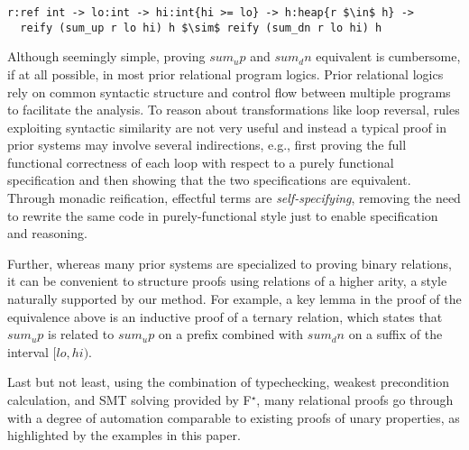 \documentclass[sigplan,screen]{acmart}\settopmatter{}
\newcommand\fstar{F$^\star$\xspace}
\newcommand{\comm}[3]{\ifcheckpagebudget\else\ifdraft{\maybecolor{#1}[#2: #3]}\fi\fi}
\newcommand{\nik}[1]{\comm{dkpurple}{Nik}{#1}}
\newcommand{\ch}[1]{\comm{teal}{CH}{#1}}
\begin{document}
\begin{lstlisting}
r:ref int -> lo:int -> hi:int{hi >= lo} -> h:heap{r $\in$ h} -> 
  reify (sum_up r lo hi) h $\sim$ reify (sum_dn r lo hi) h
\end{lstlisting}




Although seemingly simple, proving \ls$sum_up$ and \ls$sum_dn$
equivalent is cumbersome, if at all possible, in most prior
relational program logics. Prior relational logics rely on common
syntactic structure and control flow between multiple programs to
facilitate the analysis. To reason about transformations like loop
reversal, rules exploiting syntactic similarity are not very useful
and instead a typical proof in prior systems may involve several
indirections, e.g., first proving the full functional correctness of
each loop with respect to a purely functional specification and then
showing that the two specifications are equivalent.
Through monadic reification, effectful terms are
\emph{self-specifying}, removing the need to rewrite the same
code in purely-functional style just to enable specification and reasoning.

Further, whereas many prior systems are specialized to proving binary
relations, it can be convenient to structure proofs using relations
of a higher arity, a style naturally supported by our method. For
example, a key lemma in the proof of the equivalence above is an
inductive proof of a ternary relation, which states
that \ls$sum_up$ is related to \ls$sum_up$ on a prefix combined
with \ls$sum_dn$ on a suffix of the interval \ls$[lo, hi)$.

Last but not least, using the combination of typechecking, weakest
precondition calculation, and SMT solving provided by \fstar, many
relational proofs go through with a degree of automation comparable to
existing proofs of unary properties,
as highlighted by the examples in this paper.
\end{document}
